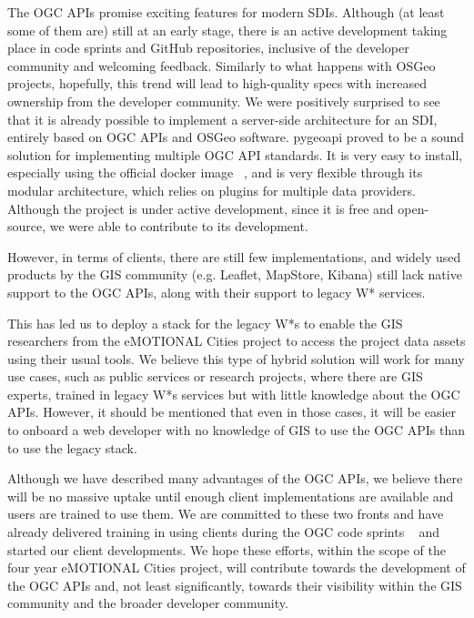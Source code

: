 \documentclass{isprs} %
\begin{document}
The OGC APIs promise exciting features for modern SDIs. Although (at least some of them are) still at an early stage, there is an active development taking place in code sprints and GitHub repositories, inclusive of the developer community and welcoming feedback.
Similarly to what happens with OSGeo projects, hopefully, this trend will lead to high-quality specs with increased ownership from the developer community.
We were positively surprised to see that it is already possible to implement a server-side architecture for an SDI, entirely based on OGC APIs and OSGeo software. pygeoapi proved to be a sound solution for implementing multiple OGC API standards. It is very easy to install, especially using the official docker image ~\cite{dockerhubpygeoapi2022}, and is very flexible through its modular architecture, which relies on plugins for multiple data providers. Although the project is under active development, since it is free and open-source, we were able to contribute to its development.

However, in terms of clients, there are still few implementations, and widely used products by the GIS community (e.g. Leaflet, MapStore, Kibana) still lack native support to the OGC APIs, along with their support to legacy W* services.

This has led us to deploy a stack for the legacy W*s to enable the GIS researchers from the eMOTIONAL Cities project to access the project data assets using their usual tools. We believe this type of hybrid solution will work for many use cases, such as public services or research projects, where there are GIS experts, trained in legacy W*s services but with little knowledge about the OGC APIs. However, it should be mentioned that even in those cases, it will be easier to onboard a web developer with no knowledge of GIS to use the OGC APIs than to use the legacy stack.

Although we have described many advantages of the OGC APIs, we believe there will be no massive uptake until enough client implementations are available and users are trained to use them. We are committed to these two fronts and have already delivered training in using clients during the OGC code sprints ~\cite{qgisclientworkshop2022,bootstrapogcapi2022} and started our client developments. We hope these efforts, within the scope of the four year eMOTIONAL Cities project, will contribute towards the development of the OGC APIs and, not least significantly, towards their visibility within the GIS community and the broader developer community.
\end{document}
